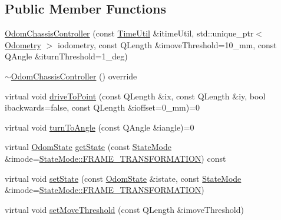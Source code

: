 \subsection*{Public Member Functions}
\begin{DoxyCompactItemize}
\item 
\mbox{\hyperlink{classokapi_1_1OdomChassisController_a91015290cdd5f9c459adfb59115bc92d}{Odom\+Chassis\+Controller}} (const \mbox{\hyperlink{classokapi_1_1TimeUtil}{Time\+Util}} \&itime\+Util, std\+::unique\+\_\+ptr$<$ \mbox{\hyperlink{classokapi_1_1Odometry}{Odometry}} $>$ iodometry, const Q\+Length \&imove\+Threshold=10\+\_\+mm, const Q\+Angle \&iturn\+Threshold=1\+\_\+deg)
\item 
\mbox{\hyperlink{classokapi_1_1OdomChassisController_a25ee4fe0432b6cdc8052a869856cfc7c}{$\sim$\+Odom\+Chassis\+Controller}} () override
\item 
virtual void \mbox{\hyperlink{classokapi_1_1OdomChassisController_a5e87dea6c90a200bc6a9dc638e45365a}{drive\+To\+Point}} (const Q\+Length \&ix, const Q\+Length \&iy, bool ibackwards=false, const Q\+Length \&ioffset=0\+\_\+mm)=0
\item 
virtual void \mbox{\hyperlink{classokapi_1_1OdomChassisController_ac90298bb9081d95c52800dbf679dd658}{turn\+To\+Angle}} (const Q\+Angle \&iangle)=0
\item 
virtual \mbox{\hyperlink{structokapi_1_1OdomState}{Odom\+State}} \mbox{\hyperlink{classokapi_1_1OdomChassisController_aa7b4675edd3cdd920e287fc5e824892f}{get\+State}} (const \mbox{\hyperlink{namespaceokapi_af37fbd761bd859a00ff4dd4a87dd8c07}{State\+Mode}} \&imode=\mbox{\hyperlink{namespaceokapi_af37fbd761bd859a00ff4dd4a87dd8c07ad5ed7666e5cebf60d3af20a5a46edf3b}{State\+Mode\+::\+F\+R\+A\+M\+E\+\_\+\+T\+R\+A\+N\+S\+F\+O\+R\+M\+A\+T\+I\+ON}}) const
\item 
virtual void \mbox{\hyperlink{classokapi_1_1OdomChassisController_a843ab24d9ed26ba68833ece0b28bf345}{set\+State}} (const \mbox{\hyperlink{structokapi_1_1OdomState}{Odom\+State}} \&istate, const \mbox{\hyperlink{namespaceokapi_af37fbd761bd859a00ff4dd4a87dd8c07}{State\+Mode}} \&imode=\mbox{\hyperlink{namespaceokapi_af37fbd761bd859a00ff4dd4a87dd8c07ad5ed7666e5cebf60d3af20a5a46edf3b}{State\+Mode\+::\+F\+R\+A\+M\+E\+\_\+\+T\+R\+A\+N\+S\+F\+O\+R\+M\+A\+T\+I\+ON}})
\item 
virtual void \mbox{\hyperlink{classokapi_1_1OdomChassisController_adf98b0e1b91d1f72cce5b76b992257a0}{set\+Move\+Threshold}} (const Q\+Length \&imove\+Threshold)
\item 

\end{DoxyCompactItemize}
